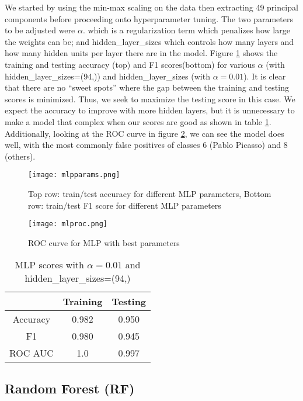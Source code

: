 \documentclass[12pt]{article}
\begin{document}
We started by using the min-max scaling on the data then extracting 49 principal components before proceeding onto hyperparameter tuning. The two parameters to be adjusted were $\alpha$. which is a regularization term which penalizes how large the weights can be; and hidden\_layer\_sizes which controls how many layers and how many hidden units per layer there are in the model. Figure \ref{mlpparams} shows the training and testing accuracy (top) and F1 scores(bottom) for various $\alpha$ (with hidden\_layer\_sizes=(94,)) and hidden\_layer\_sizes (with $ \alpha=0.01 $). It is clear that there are no ``sweet spots'' where the gap between the training and testing scores is minimized. Thus, we seek to maximize the testing score in this case. We expect the accuracy to improve with more hidden layers, but it is unnecessary to make a model that complex when our scores are good as shown in table \ref{table: 8}. Additionally, looking at the ROC curve in figure \ref{mlproc}, we can see the model does well, with the most commonly false positives of classes 6 (Pablo Picasso) and 8 (others).

\begin{figure}[h]
	\centering
	\texttt{[image: mlpparams.png]}
	\caption{Top row: train/test accuracy for different MLP parameters, Bottom row: train/test F1 score for different MLP parameters}
	\label{mlpparams}
\end{figure}
\begin{figure}[h]
	\centering
	\texttt{[image: mlproc.png]}
	\caption{ROC curve for MLP with best parameters}
	\label{mlproc}
\end{figure}

\begin{table}[h!]
	\centering
	\begin{tabular}{| c|cc|} 
		\hline
		& Training & Testing\\ \hline
		Accuracy & 0.982 &0.950 \\ 
		F1 &  0.980 &0.945\\ 
		ROC AUC & 1.0 &0.997\\
		\hline
	\end{tabular}
	\caption{MLP scores with $\alpha=0.01$ and hidden\_layer\_sizes=(94,)}
	\label{table: 8}
\end{table}
\FloatBarrier

\subsection{Random Forest (RF)}
\end{document}
